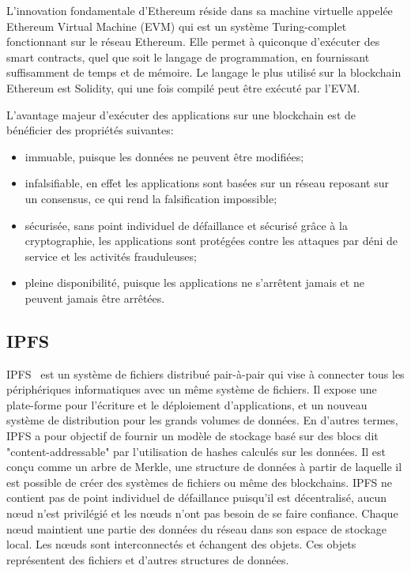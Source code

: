 \documentclass{tnreport}
\begin{document}
L'innovation fondamentale d'Ethereum réside dans sa machine virtuelle appelée Ethereum Virtual Machine (EVM) qui est un système Turing-complet fonctionnant sur le réseau Ethereum. Elle permet à quiconque d'exécuter des smart contracts, quel que soit le langage de programmation, en fournissant suffisamment de temps et de mémoire. Le langage le plus utilisé sur la blockchain Ethereum est Solidity, qui une fois compilé peut être exécuté par l'EVM.

L'avantage majeur d'exécuter des applications sur une blockchain est de bénéficier des propriétés suivantes:
\begin{itemize}
	\item immuable, puisque les données ne peuvent être modifiées;
	\item infalsifiable, en effet les applications sont basées sur un réseau reposant sur un consensus, ce qui rend la falsification impossible;
	\item sécurisée, sans point individuel de défaillance et sécurisé grâce à la cryptographie, les applications sont protégées contre les attaques par déni de service et les activités frauduleuses;
	\item pleine disponibilité, puisque les applications ne s'arrêtent jamais et ne peuvent jamais être arrêtées.
\end{itemize}

\subsection{IPFS}

IPFS~\cite{ipfs-paper} est un système de fichiers distribué pair-à-pair qui vise à connecter tous les périphériques informatiques avec un même système de fichiers. Il expose une plate-forme pour l'écriture et le déploiement d'applications, et un nouveau système de distribution pour les grands volumes de données. 
En d'autres termes, IPFS a pour objectif de fournir un modèle de stockage basé sur des blocs dit "content-addressable" par l'utilisation de hashes calculés sur les données. Il est conçu comme un arbre de Merkle, une structure de données à partir de laquelle il est possible de créer des systèmes de fichiers ou même des blockchains. IPFS ne contient pas de point individuel de défaillance puisqu'il est décentralisé, aucun nœud n'est privilégié et les nœuds n'ont pas besoin de se faire confiance. 
Chaque nœud maintient une partie des données du réseau dans son espace de stockage local. 
Les nœuds sont interconnectés et échangent des objets. Ces objets représentent des fichiers et d'autres structures de données.
\end{document}
